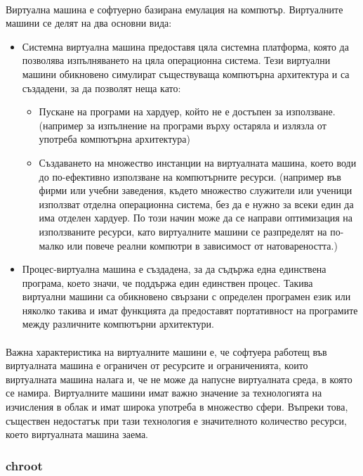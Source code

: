 \documentclass[pdftex,14pt,a4paper]{extreport}
\begin{document}
\paragraph {}
Виртуална машина е софтуерно базирана емулация на компютър. Виртуалните машини се делят на два основни вида:
\begin{itemize}
  \item Системна виртуална машина предоставя цяла системна платформа, която да позволява изпълняването на цяла операционна система. Тези виртуални машини обикновено симулират съществуваща компютърна архитектура и са създадени, за да позволят неща като:
  \begin{itemize}
    \item Пускане на програми на хардуер, който не е достъпен за използване. (например за изпълнение на програми върху остаряла и излязла от употреба компютърна архитектура)
    \item Създаването на множество инстанции на виртуалната машина, което води до по-ефективно използване на компютърните ресурси. (например във фирми или учебни заведения, където множество служители или ученици използват отделна операционна система, без да е нужно за всеки един да има отделен хардуер. По този начин може да се направи оптимизация на използваните ресурси, като виртуалните машини се разпределят на по-малко или повече реални компютри в зависимост от натовареността.)
  \end{itemize}
\item Процес-виртуална машина е създадена, за да съдържа една единствена програма, което значи, че поддържа един единствен процес. Такива виртуални машини са обикновено свързани с определен програмен език или няколко такива и имат функцията да предоставят портативност на програмите между различните компютърни архитектури.
\end{itemize}
\paragraph {}
Важна характеристика на виртуалните машини е, че софтуера работещ във виртуалната машина е ограничен от ресурсите и ограниченията, които виртуалната машина налага и, че не може да напусне виртуалната среда, в която се намира. Виртуалните машини имат важно значение за технологията на изчисления в облак и имат широка употреба в множество сфери. Въпреки това, съществен недостатък при тази технология е значителното количество ресурси, което виртуалната машина заема.
\subsubsection {chroot}
\end{document}
